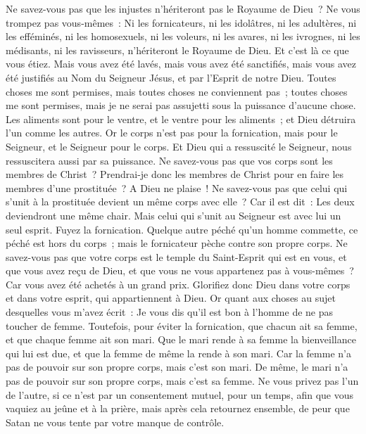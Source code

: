 \begin{multicols}{2}
Ne savez-vous pas que les injustes n'hériteront pas le Royaume de Dieu~? Ne vous trompez pas vous-mêmes~: Ni les fornicateurs, ni les idolâtres, ni les adultères,
ni les efféminés, ni les homosexuels, ni les voleurs, ni les avares, ni les ivrognes, ni les médisants, ni les ravisseurs, n'hériteront le Royaume de Dieu.
Et c'est là ce que vous étiez. Mais vous avez été lavés, mais vous avez été sanctifiés, mais vous avez été justifiés au Nom du Seigneur Jésus, et par l'Esprit de notre Dieu.
Toutes choses me sont permises, mais toutes choses ne conviennent pas~; toutes choses me sont permises, mais je ne serai pas assujetti sous la puissance d'aucune chose.
Les aliments sont pour le ventre, et le ventre pour les aliments~; et Dieu détruira l'un comme les autres. Or le corps n'est pas pour la fornication, mais pour le Seigneur, et le Seigneur pour le corps.
Et Dieu qui a ressuscité le Seigneur, nous ressuscitera aussi par sa puissance.
Ne savez-vous pas que vos corps sont les membres de Christ~? Prendrai-je donc les membres de Christ pour en faire les membres d'une prostituée~? A Dieu ne plaise~!
Ne savez-vous pas que celui qui s'unit à la prostituée devient un même corps avec elle~? Car il est dit~: Les deux deviendront une même chair.
Mais celui qui s'unit au Seigneur est avec lui un seul esprit.
Fuyez la fornication. Quelque autre péché qu'un homme commette, ce péché est hors du corps~; mais le fornicateur pèche contre son propre corps.
Ne savez-vous pas que votre corps est le temple du Saint-Esprit qui est en vous, et que vous avez reçu de Dieu, et que vous ne vous appartenez pas à vous-mêmes~?
Car vous avez été achetés à un grand prix. Glorifiez donc Dieu dans votre corps et dans votre esprit, qui appartiennent à Dieu.
\VerseOne{}Or quant aux choses au sujet desquelles vous m'avez écrit~: Je vous dis qu'il est bon à l'homme de ne pas toucher de femme.
Toutefois, pour éviter la fornication, que chacun ait sa femme, et que chaque femme ait son mari.
Que le mari rende à sa femme la bienveillance qui lui est due, et que la femme de même la rende à son mari.
Car la femme n'a pas de pouvoir sur son propre corps, mais c'est son mari. De même, le mari n'a pas de pouvoir sur son propre corps, mais c'est sa femme.
Ne vous privez pas l'un de l'autre, si ce n'est par un consentement mutuel, pour un temps, afin que vous vaquiez au jeûne et à la prière, mais après cela retournez ensemble, de peur que Satan ne vous tente par votre manque de contrôle.

\end{multicols}
